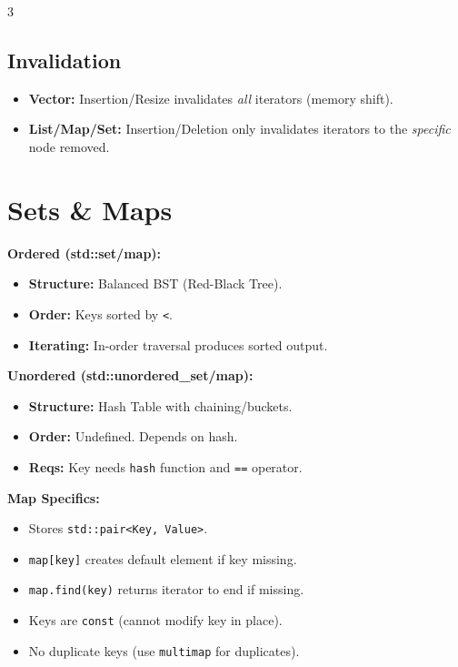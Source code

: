\documentclass[10pt, landscape, a4paper]{article}
\begin{document}
\begin{multicols*}{3}
  \subsection{Invalidation}
  \begin{itemize}
    \item \textbf{Vector:} Insertion/Resize invalidates \textit{all}
      iterators (memory shift).
    \item \textbf{List/Map/Set:} Insertion/Deletion only invalidates
      iterators to the \textit{specific} node removed.
  \end{itemize}

  \section{Sets \& Maps}
  \textbf{Ordered (std::set/map):}
  \begin{itemize}
    \item \textbf{Structure:} Balanced BST (Red-Black Tree).
    \item \textbf{Order:} Keys sorted by \texttt{<}.
    \item \textbf{Iterating:} In-order traversal produces sorted output.
  \end{itemize}

  \textbf{Unordered (std::unordered\_set/map):}
  \begin{itemize}
    \item \textbf{Structure:} Hash Table with chaining/buckets.
    \item \textbf{Order:} Undefined. Depends on hash.
    \item \textbf{Reqs:} Key needs \texttt{hash} function and
      \texttt{==} operator.
  \end{itemize}

  \textbf{Map Specifics:}
  \begin{itemize}
    \item Stores \texttt{std::pair<Key, Value>}.
    \item \texttt{map[key]} creates default element if key missing.
    \item \texttt{map.find(key)} returns iterator to end if missing.
    \item Keys are \texttt{const} (cannot modify key in place).
    \item No duplicate keys (use \texttt{multimap} for duplicates).
  \end{itemize}


\end{multicols*}
\end{document}
